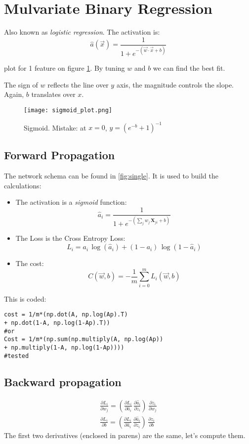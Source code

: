 \section{Mulvariate Binary Regression}
Also known as \textit{logistic regression}. The activation is:
\[
  \hat{a}(\vec{x})= \frac{1}{1+e^{-(\vec{w}\cdot{}\vec{x}+b)}}
\]

plot for 1 feature on figure \ref{fig:sigmoid}. By tuning $w$ and $b$  we can find the best fit. 

The sign of $w$ reflects the line over $y$ axis, the magnitude controls the slope. Again, $b$ translates over $x$.

\begin{figure}[h]
 \centering
 \texttt{[image: sigmoid\_plot.png]}
  \caption{Sigmoid. Mistake: at $x=0$, $y=(e^{-b}+1)^{-1}$} \label{fig:sigmoid}
\end{figure}

\subsection{Forward Propagation}
The network schema can be found in \ref{fig:single}. It is used to build the calculations:

\begin{itemize}
  \item The activation is a \textit{sigmoid} function:
\[
  \hat{a}_i = \frac{1}{1+e^{-(\sum_j w_j\, \mathbf{X}_{ji} + b)}}
\]

  \item The Loss is the Cross Entropy Loss:
\[
  L_i = a_i\,\log(\hat{a}_i) + (1-a_i)\,\log(1-\hat{a}_i)
\]

\item The cost:
\[
  C(\vec{w}, b) = -\frac{1}{m}\sum_{i=0}^m L_i(\vec{w}, b)
\]
\end{itemize}
This is coded:
\begin{verbatim}
cost = 1/m*(np.dot(A, np.log(Ap).T) 
+ np.dot(1-A, np.log(1-Ap).T))
#or
Cost = 1/m*(np.sum(np.multiply(A, np.log(Ap)) 
+ np.multiply(1-A, np.log(1-Ap))))
#tested
\end{verbatim}

\subsection{Backward propagation}

\begin{align}
  \frac{\partial L_i}{\partial w_j} = 
  \left(\frac{\partial L_i}{\partial \hat{a}_i}\, \frac{\partial \hat{a}_i}{\partial z_i}\right)\,\frac{\partial z_i}{\partial w_j}\\
  \frac{\partial L_i}{\partial b} = 
  \left(\frac{\partial L_i}{\partial \hat{a}_i}\,\frac{\partial \hat{a}_i}{\partial z_i}\right)\,\frac{\partial z_i}{\partial b}
\end{align}
The first two derivatives (enclosed in parens) are the same, let's compute them.

